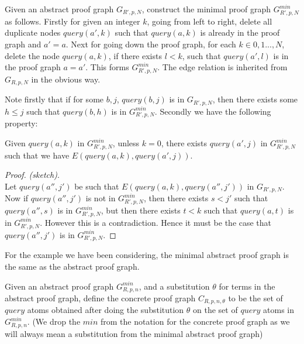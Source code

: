 \begin{definition}\label{minabsgraph}
Given an abstract proof graph $G_{R',p,N}$, construct the minimal proof graph $G_{R',p,N}^{min}$ as follows. Firstly for given an integer $k$, going from left to right, delete all duplicate nodes $query(a',k)$ such that $query(a,k)$ is already in the proof graph and $a'=a$. Next for going down the proof graph, for each $k\in {0,1...,N}$, delete the node $query(a,k)$, if there exists $l<k$, such that $query(a',l)$ is in the proof graph $a=a'$. This forms $G_{R',p,N}^{min}$. The edge relation is inherited from $G_{R,p,N}$ in the obvious way. 
\end{definition}
Note firstly that if for some $b,j$, $query(b,j)$ is in $G_{R',p,N}$, then there exists some $h\leq j$ such that $query(b,h)$ is in $G_{R',p,N}^{min}$. Secondly we have the following property:
\begin{lemma}
Given $query(a,k)$ in $G_{R',p,N}^{min}$, unless $k=0$, there exists $query(a',j)$ in $G_{R',p,N}^{min}$ such that we have $E(query(a,k),query(a',j))$.  
\end{lemma}


\begin{proof} \textit{(sketch)}. \\
Let $query(a'',j')$ be such that $E(query(a,k),query(a'',j'))$ in $G_{R',p,N}$. Now if $query(a'',j')$ is not in $G_{R',p,N}^{min}$, then there exists $s<j'$ such that $query(a'',s)$ is in $G_{R',p,N}^{min}$, but then there exists $t<k$ such that $query(a,t)$ is in $G_{R',p,N}^{min}$. However this is a contradiction. Hence it must be the case that $query(a'',j')$ is in $G_{R',p,N}^{min}$. 
\end{proof}

For the example we have been considering, the minimal abstract proof graph is the same as the abstract proof graph.

\begin{definition}\label{def:concretegraph}
Given an abstract proof graph $G_{R,p,n}^{min}$, and a substitution $\theta$ for
terms in the abstract proof graph, define the concrete proof graph
$C_{R,p,n,\theta}$ to be the set of $query$ atoms obtained after doing the
substitution $\theta$ on the set of $query$ atoms in $G_{R,p,n}^{min}$. (We drop the $min$ from the notation for the concrete proof graph as we will always mean a substitution from the minimal abstract proof graph)
\end{definition}

